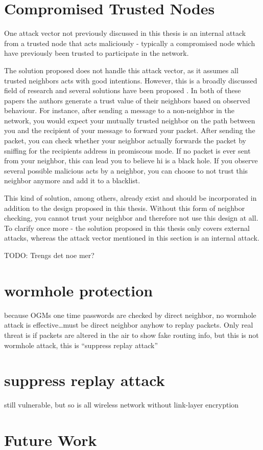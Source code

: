 \section{Compromised Trusted Nodes}
One attack vector not previously discussed in this thesis is an internal attack
from a trusted node that acts maliciously - typically a compromised node which
have previously been trusted to participate in the network.

The solution proposed does not handle this attack vector, as it assumes all
trusted neighbors acts with good intentions. However, this is a broadly
discussed field of research and several solutions have been proposed
\cite{Pirzada_McDonald} \cite{dhurandher2010network}. In both of these papers
the authors generate a trust value of their neighbors based on observed
behaviour. For instance, after sending a message to a non-neighbor in the
network, you would expect your mutually trusted neighbor on the path between
you and the recipient of your message to forward your packet. After sending the
packet, you can check whether your neighbor actually forwards the packet by
sniffing for the recipients address in promiscous mode. If no packet is ever
sent from your neighbor, this can lead you to believe hi is a black hole. If you
observe several possible malicious acts by a neighbor, you can choose to not
trust this neighbor anymore and add it to a blacklist.

This kind of solution, among others, already exist and should be incorporated in
addition to the design proposed in this thesis. Without this form of neighbor
checking, you cannot trust your neighbor and therefore not use this design at
all. To clarify once more - the solution proposed in this thesis only covers
external attacks, whereas the attack vector mentioned in this section is an
internal attack.

TODO: Trengs det noe mer?

\section{wormhole protection}
because OGMs one time passwords are checked by direct neighbor, no wormhole
attack is effective\ldots must be direct neighbor anyhow to replay packets. Only
real threat is if packets are altered in the air to show fake routing info, but
this is not wormhole attack, this is ``suppress replay attack''

\section{suppress replay attack}
still vulnerable, but so is all wireless network without link-layer encryption

\section{Future Work}

